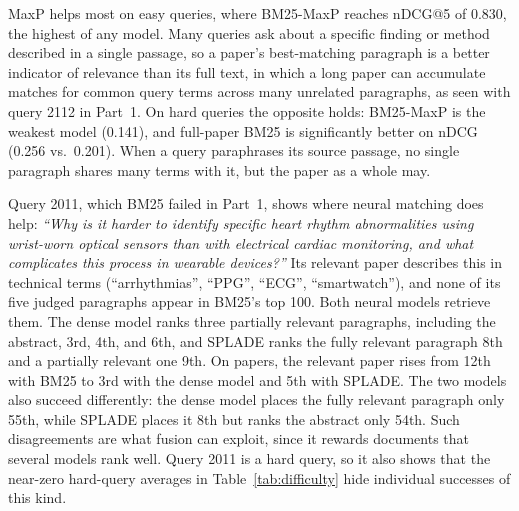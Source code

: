 \documentclass[sigconf,nonacm]{acmart}
\begin{document}
MaxP helps most on easy queries, where BM25-MaxP reaches nDCG@5 of 0.830, the 
highest of any model. Many queries ask about a specific finding or method described 
in a single passage, so a paper's best-matching paragraph is a better indicator 
of relevance than its full text, in which a long paper can accumulate matches for 
common query terms across many unrelated paragraphs, as seen with query 2112 in Part~1. 
On hard queries the opposite holds: BM25-MaxP is the weakest model (0.141), and 
full-paper BM25 is significantly better on nDCG (0.256 vs.\ 0.201). When a query 
paraphrases its source passage, no single paragraph shares many terms with it, but 
the paper as a whole may.

Query 2011, which BM25 failed in Part~1, shows where neural matching does help: 
\textit{``Why is it harder to identify specific heart rhythm abnormalities using 
wrist-worn optical sensors than with electrical cardiac monitoring, and what 
complicates this process in wearable devices?''} Its relevant paper describes this 
in technical terms (``arrhythmias'', ``PPG'', ``ECG'', ``smartwatch''), and none 
of its five judged paragraphs appear in BM25's top 100. Both neural models retrieve 
them. The dense model ranks three partially relevant paragraphs, including the 
abstract, 3rd, 4th, and 6th, and SPLADE ranks the fully relevant paragraph 8th 
and a partially relevant one 9th. On papers, the relevant paper rises from 12th 
with BM25 to 3rd with the dense model and 5th with SPLADE. The two models also 
succeed differently: the dense model places the fully relevant paragraph only 55th, 
while SPLADE places it 8th but ranks the abstract only 54th. Such disagreements are 
what fusion can exploit, since it rewards documents that several models rank well. 
Query 2011 is a hard query, so it also shows that the near-zero hard-query averages 
in Table~\ref{tab:difficulty} hide individual successes of this kind.
\end{document}
